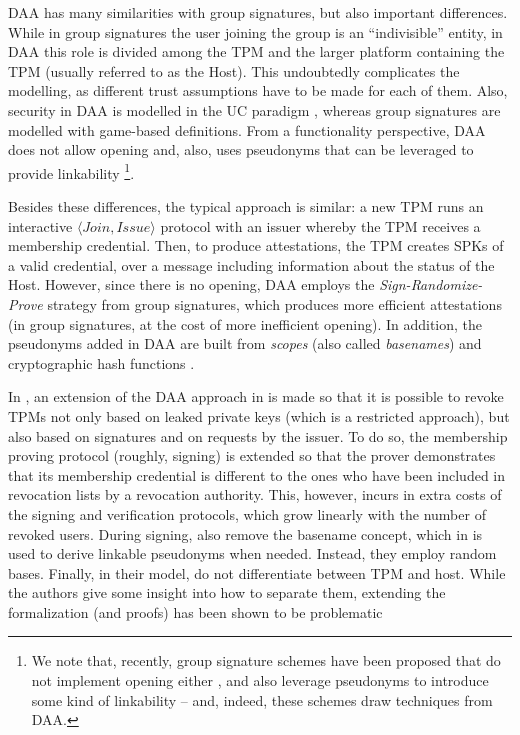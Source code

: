 
DAA has many similarities with group signatures, but also important differences.
While in group signatures the user joining the group is an ``indivisible''
entity, in DAA this role is divided among the TPM and the larger platform
containing the TPM (usually referred to as the Host). This undoubtedly
complicates the modelling, as different trust assumptions have to be made for
each of them. Also, security in DAA is modelled in the UC paradigm 
,
whereas group signatures are modelled with game-based definitions. From a
functionality perspective, DAA does not allow opening and, also, uses pseudonyms
that can be leveraged to provide linkability%
\footnote{We note that, recently, group signature schemes have been proposed
  that do not implement opening either \cite{dl21}, and also leverage pseudonyms
  to introduce some kind of linkability \cite{gl19,kss19,dl21} -- and, indeed,
  these schemes draw techniques from DAA.}.

Besides these differences, the typical approach is similar: a new TPM runs an
interactive $\langle Join,Issue \rangle$ protocol with an issuer whereby the
TPM receives a membership credential. Then, to produce attestations, the TPM
creates SPKs of a valid credential, over a message including information about
the status of the Host. However, since there is no opening, DAA employs the
\emph{Sign-Randomize-Prove} strategy from group signatures, which produces more
efficient attestations (in group signatures, at the cost of more inefficient
opening). In addition, the pseudonyms added in DAA are built from \emph{scopes}
(also called \emph{basenames}) and cryptographic hash functions .

In \cite{bl07}, an extension of the DAA approach in \cite{bcc04} is made so
that it is possible to revoke TPMs not only based on leaked private keys (which
is a restricted approach), but also based on signatures and on requests by the
issuer. To do so, the membership proving protocol (roughly, signing) is extended
so that the prover demonstrates that its membership credential is different to
the ones who have been included in revocation lists by a revocation authority.
This, however, incurs in extra costs of the signing and verification protocols,
which grow linearly with the number of revoked users. During signing, \cite{bl07}
also remove the basename concept, which in \cite{bcc04} is used to derive
linkable pseudonyms when needed. Instead, they employ random bases. Finally, in
their model, \cite{bl07} do not differentiate between TPM and host. While the
authors give some insight into how to separate them, extending the formalization
(and proofs) has been shown to be problematic 

